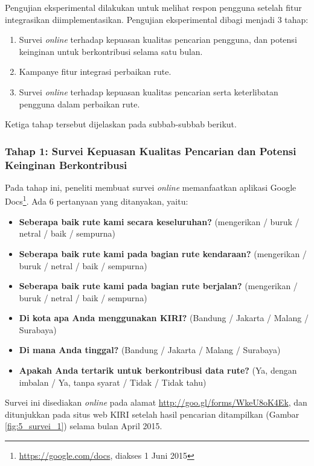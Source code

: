 Pengujian eksperimental dilakukan untuk melihat respon pengguna setelah fitur integrasikan diimplementasikan. Pengujian eksperimental dibagi menjadi 3 tahap:

\begin{enumerate}
	\item Survei \textit{online} terhadap kepuasan kualitas pencarian pengguna, dan potensi keinginan untuk berkontribusi selama satu bulan.
	\item Kampanye fitur integrasi perbaikan rute.
	\item Survei \textit{online} terhadap kepuasan kualitas pencarian serta keterlibatan pengguna dalam perbaikan rute.
\end{enumerate}

Ketiga tahap tersebut dijelaskan pada subbab-subbab berikut.

\subsubsection{Tahap 1: Survei Kepuasan Kualitas Pencarian dan Potensi Keinginan Berkontribusi}

Pada tahap ini, peneliti membuat survei \textit{online} memanfaatkan aplikasi Google Docs\footnote{\url{https://google.com/docs}, diakses 1 Juni 2015}. Ada 6 pertanyaan yang ditanyakan, yaitu:

\begin{itemize}
	\item \textbf{Seberapa baik rute kami secara keseluruhan?} (mengerikan / buruk / netral / baik / sempurna)
	\item \textbf{Seberapa baik rute kami pada bagian rute kendaraan?} (mengerikan / buruk / netral / baik / sempurna)
	\item \textbf{Seberapa baik rute kami pada bagian rute berjalan?} (mengerikan / buruk / netral / baik / sempurna)
	\item \textbf{Di kota apa Anda menggunakan KIRI?} (Bandung / Jakarta / Malang / Surabaya)
	\item \textbf{Di mana Anda tinggal?} (Bandung / Jakarta / Malang / Surabaya)
	\item \textbf{Apakah Anda tertarik untuk berkontribusi data rute?} (Ya, dengan imbalan / Ya, tanpa syarat / Tidak / Tidak tahu)
\end{itemize}

Survei ini disediakan \textit{online} pada alamat \url{http://goo.gl/forms/WkeU8oK4Ek}, dan ditunjukkan pada situs web KIRI setelah hasil pencarian ditampilkan (Gambar \ref{fig:5_survei_1}) selama bulan April 2015.

